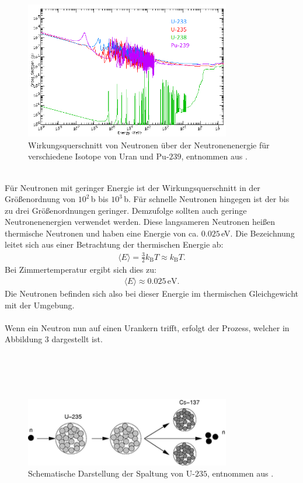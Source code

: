 \documentclass[german,  %
parskip=full,  %
]{scrartcl}
\begin{document}
\begin{figure}[h!]\centering
\includegraphics[width=0.8\textwidth]{sigma_neutronen}
\caption{Wirkungsquerschnitt von Neutronen über der Neutronenenergie für verschiedene Isotope von Uran und Pu-$239$, entnommen aus \cite{sigma_neutronen}.}
\end{figure}
\\
Für Neutronen mit geringer Energie ist der Wirkungsquerschnitt in der Größenordnung von $10^2$\,b bis $10^3$\,b. Für schnelle Neutronen hingegen ist der bis zu drei Größenordnungen geringer. Demzufolge sollten auch geringe Neutronenenergien verwendet werden. Diese langsameren Neutronen heißen thermische Neutronen und haben eine Energie von ca. $0.025$\,eV. Die Bezeichnung leitet sich aus einer Betrachtung der thermischen Energie ab:
\begin{align}
\langle E \rangle = \frac{3}{2} k_{\text{B}} T \approx  k_{\text{B}} T.
\end{align}
Bei Zimmertemperatur ergibt sich dies zu:
\begin{align}
\langle E \rangle \approx 0.025\,\text{eV}.
\end{align}
Die Neutronen befinden sich also bei dieser Energie im thermischen Gleichgewicht mit der Umgebung.
\\\\
Wenn ein Neutron nun auf einen Urankern trifft, erfolgt der Prozess, welcher in Abbildung 3 dargestellt ist.
\\\\\\\\\\
\begin{figure}[h!]\centering
\includegraphics[width=0.8\textwidth]{spaltung_uran}
\caption{Schematische Darstellung der Spaltung von U-$235$, entnommen aus \cite{spaltung_uran}.}
\end{figure}
\end{document}
